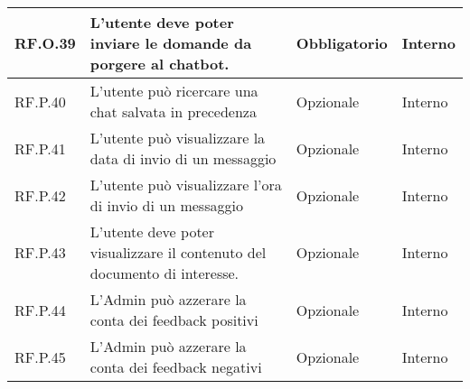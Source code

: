 \begin{longtable}{|C{2.7cm}|L{7.2cm}|C{2.7cm}|C{2cm}|}
        \hline
        RF.O.39 & L’utente deve poter inviare le domande da porgere al chatbot.
         & Obbligatorio & Interno \\
        \hline
        RF.P.40 & L’utente può ricercare una chat salvata in precedenza
         & Opzionale & Interno \\
        \hline
        RF.P.41 & L’utente può visualizzare la data di invio di un messaggio
         & Opzionale & Interno \\
        \hline
        RF.P.42 & L’utente può visualizzare l'ora di invio di un messaggio
         & Opzionale & Interno \\
        \hline
        RF.P.43 & L’utente deve poter visualizzare il contenuto del documento di interesse.
         & Opzionale & Interno \\
        \hline
        RF.P.44 & L'Admin può azzerare la conta dei feedback positivi
         & Opzionale & Interno \\
        \hline
        RF.P.45 & L'Admin può azzerare la conta dei feedback negativi
         & Opzionale & Interno \\
        \hline
        
        


\end{longtable}
